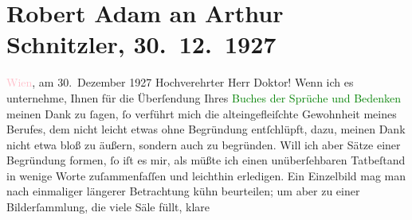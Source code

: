 

               \section[Robert Adam an Arthur Schnitzler, 30. 12. 1927]{ Robert Adam an Arthur Schnitzler, 30. 12. 1927}\nopagebreak{}\rehead{ }\normalsize\beginnumbering{} \toendnotes[C]{\smallbreak\pagebreak[2]} 
\pstart
           \raggedleft{}{\pb}\textcolor{pink}{Wien}{}\ledrightnote{\textcolor{pink}{Wien}}, am 30. Dezember 1927\pend
           \pstart{}Hochverehrter Herr Doktor!\pend\pstart
           Wenn ich es unternehme, Ihnen für die Überſendung Ihres \textcolor{green}{Buches der Sprüche und Bedenken}{}\ledrightnote{\textcolor{green}{Buch der Sprüche und Bedenken}} meinen Dank zu ſagen, ſo
                    verführt mich die alteingefleiſchte Gewohnheit meines Berufes, dem nicht leicht
                    etwas ohne Begründung entſchlüpft, dazu, meinen Dank nicht etwa bloß zu äußern,
                    sondern auch zu begründen. Will ich aber Sätze einer Begründung formen, ſo iſt
                    es mir, als müßte ich einen unüberſehbaren Tatbeſtand in wenige Worte
                    zuſammenfaſſen und leichthin erledigen. Ein Einzelbild mag man nach einmaliger
                    längerer Betrachtung {\pb}kühn
                    beurteilen; um aber zu einer Bilderſammlung, die viele Säle füllt, klare
